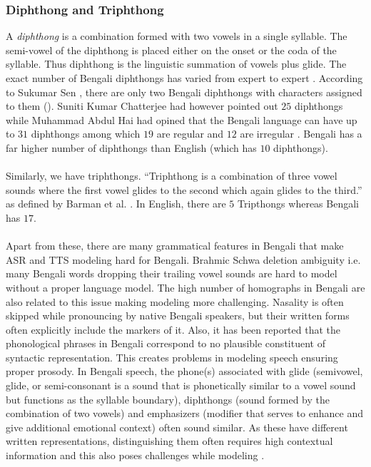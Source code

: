 \subsubsection{Diphthong and Triphthong}

A \textit{diphthong} is a combination formed with two vowels in a single syllable. The semi-vowel of the diphthong is placed either on the onset or the coda of the syllable. Thus diphthong is the linguistic summation of vowels plus glide. The exact number of Bengali diphthongs has varied from expert to expert \cite{jeenatAli}. According to  Sukumar Sen \cite{sukumar1994bhasar}, there are only two Bengali diphthongs with characters assigned to them ({}). Suniti Kumar Chatterjee \cite{suneetikumarC} had however pointed out $25$ diphthongs while Muhammad Abdul Hai had opined that the Bengali language can have up to $31$ diphthongs among which $19$ are regular and $12$ are irregular \cite{muhammad2009sound}. Bengali has a far higher number of diphthongs than English (which has $10$ diphthongs).
\\\\
Similarly, we have triphthongs. ``Triphthong  is  a  combination  of  three  vowel  sounds  where  the  first vowel glides to the second which again glides to the third.'' as defined by Barman et al. \cite{barman2009contrastive}.
In English, there are $5$ Tripthongs whereas Bengali has $17$. 
\\\\
Apart from these, there are many grammatical features in Bengali that make ASR and TTS modeling hard for Bengali. Brahmic Schwa deletion ambiguity \cite{johny2018brahmic} i.e. many Bengali words dropping their trailing vowel sounds are hard to model without a proper language model. The high number of homographs in Bengali \cite{rashidprocess} \cite{homographSayma} are also related to this issue making modeling more challenging. Nasality \cite{hawkins1985acoustic} is often skipped while pronouncing by native Bengali speakers, but their written forms often explicitly include the markers of it. Also, it has been reported \cite{hayes1991bengali} that the phonological phrases in Bengali correspond to no plausible constituent of syntactic representation. This creates problems in modeling speech ensuring proper prosody. In Bengali speech, the phone(s) associated with glide (semivowel, glide, or semi-consonant is a sound that is phonetically similar to a vowel sound but functions as the syllable boundary), diphthongs (sound formed by the combination of two vowels) and emphasizers (modifier that serves to enhance and give additional emotional context) often sound similar. As these have different written representations, distinguishing them often requires high contextual information and this also poses challenges while modeling \cite{mandal2007word}. 
